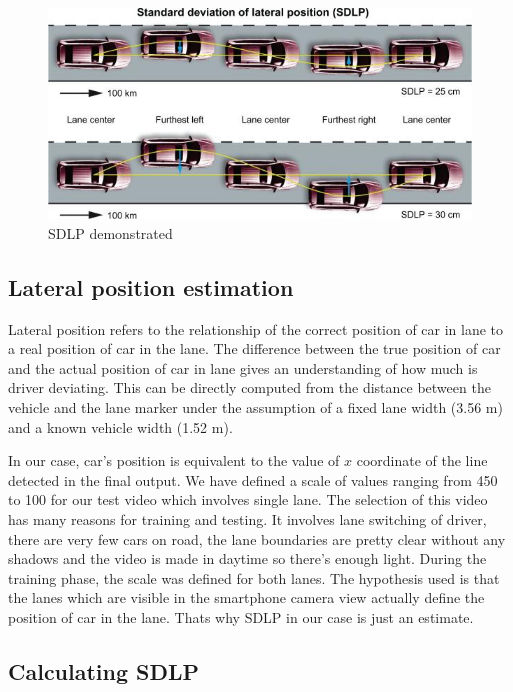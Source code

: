 \begin{figure}
\begin{center}
    \includegraphics[scale=0.6]{img/lane10.png}
\end{center}
\caption{SDLP demonstrated}
\label{fig:lane10}
\end{figure}

\subsection{Lateral position estimation}

Lateral position refers to the relationship of the correct position of car in lane to a real position of car in the lane. The difference between the true position of car and the actual position of car in lane gives an understanding of how much is driver deviating. This can be directly computed from the distance between the vehicle and the lane marker under the assumption of a fixed lane width (3.56 m) and a known vehicle width (1.52 m). 

In our case, car's position is equivalent to the value of $x$ coordinate of the line detected in the final output. We have defined a scale of values ranging from 450 to 100 for our test video which involves single lane. The selection of this video has many reasons for training and testing. It involves lane switching of driver, there are very few cars on road, the lane boundaries are pretty clear without any shadows and the video is made in daytime so there's enough light. During the training phase, the scale was defined for both lanes. The hypothesis used is that the lanes which are visible in the smartphone camera view actually define the position of car in the lane. Thats why SDLP in our case is just an estimate. 

\subsection{Calculating SDLP}

